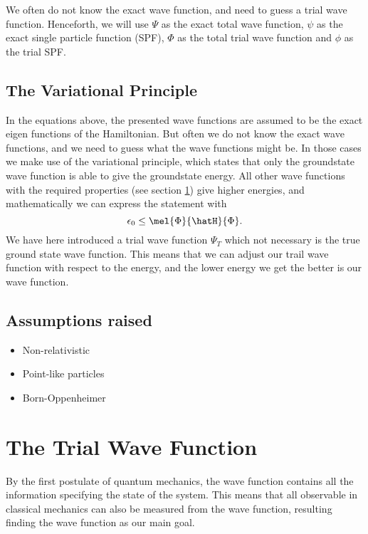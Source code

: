 We often do not know the exact wave function, and need to guess a trial wave function. Henceforth, we will use $\Psi$ as the exact total wave function, $\psi$ as the exact single particle function (SPF), $\Phi$ as the total trial wave function and $\phi$ as the trial SPF. 
\cite{GriffQuan}

\subsection{The Variational Principle}
In the equations above, the presented wave functions are assumed to be the exact eigen functions of the Hamiltonian. But often we do not know the exact wave functions, and we need to guess what the wave functions might be. In those cases we make use of the variational principle, which states that only the groundstate wave function is able to give the groundstate energy. All other wave functions with the required properties (see section \ref{subsec:wavefunction}) give higher energies, and mathematically we can express the statement with
\begin{equation}
\epsilon_0\leq\mel{\Phi}{\hatH}{\Phi}.
\label{eq:variationalprinciple}
\end{equation}
We have here introduced a trial wave function $\Psi_T$ which not necessary is the true ground state wave function. This means that we can adjust our trail wave function with respect to the energy, and the lower energy we get the better is our wave function. 

\subsection{Assumptions raised}
\begin{itemize}
	\item Non-relativistic
	\item Point-like particles
	\item Born-Oppenheimer
\end{itemize}

\section{The Trial Wave Function} \label{subsec:wavefunction}
By the first postulate of quantum mechanics, the wave function contains all the information specifying the state of the system. This means that all observable in classical mechanics can also be measured from the wave function, resulting finding the wave function as our main goal. 

